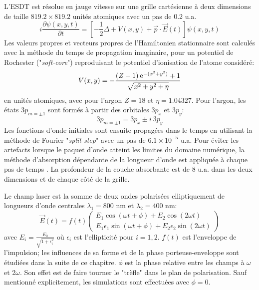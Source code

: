 L'ESDT est résolue en jauge vitesse sur une grille cartésienne à deux dimensions de taille $819.2 \times 819.2$ unités atomiques avec un pas de 0.2 u.a.
\begin{equation}
i \frac{\partial \psi(x,y,t)}{\partial t} = \left[-\frac{1}{2} \Delta + V(x,y) + \vec{p} \cdot \vec{E}(t) \right] \psi(x,y,t)
\end{equation}
Les valeurs propres et vecteurs propres de l'Hamiltonien stationnaire sont calculés avec la méthode du temps de propagation imaginaire, pour un potentiel de Rochester ("\textit{soft-core}") reproduisant le potentiel d'ionisation de l'atome considéré:
\begin{equation}
V(x,y) = - \frac{(Z-1) \: \mathrm{e}^{-(x^2+y^2)}+1}{\sqrt{x^2 + y^2 + \eta}}
\end{equation}
en unités atomiques, avec pour l'argon $Z = 18$ et $\eta = 1.04327$. Pour l'argon, les états $3p_{m=\pm 1}$ sont formés à partir des orbitales $3p_x$ et $3p_y$:
\begin{equation}
3p_{m=\pm 1} = 3p_x \pm i \: 3p_y
\end{equation}
Les fonctions d'onde initiales sont ensuite propagées dans le temps en utilisant la méthode de Fourier "\textit{split-step}"  avec un pas de $6.1 \times 10^{-5}$ u.a. Pour éviter les artefacts lorsque le paquet d'onde atteint les limites du domaine numérique, la méthode d'absorption dépendante de la longueur d'onde est appliquée à chaque pas de temps . La profondeur de la couche absorbante est de 8 u.a. dans les deux dimensions et de chaque côté de la grille.

Le champ laser est la somme de deux ondes polarisées elliptiquement de longueurs d'onde centrales $\lambda_1 = 800$ nm et $\lambda_2 = 400$ nm:
\begin{equation}
\vec{E}(t) = f(t) \begin{pmatrix}
E_1 \cos (\omega t + \phi) + E_2 \cos (2\omega t) \\
E_1 \epsilon_1 \sin (\omega t + \phi) + E_2 \epsilon_2 \sin (2\omega t)
\end{pmatrix}
\label{eq:champTA}
\end{equation}
avec $E_i = \frac{E_0}{\sqrt{1 + \epsilon_i^2}}$ où $\epsilon_i$ est l'ellipticité pour $i = 1,2$. $f(t)$ est l'enveloppe de l'impulsion; les influences de sa forme et de la phase porteuse-enveloppe sont étudiées dans la suite de ce chapitre. $\phi$ est la phase relative entre les champs à $\omega$ et 2$\omega$. Son effet est de faire tourner le "trèfle" dans le plan de polarisation. Sauf mentionné explicitement, les simulations sont effectuées avec $\phi = 0$.

